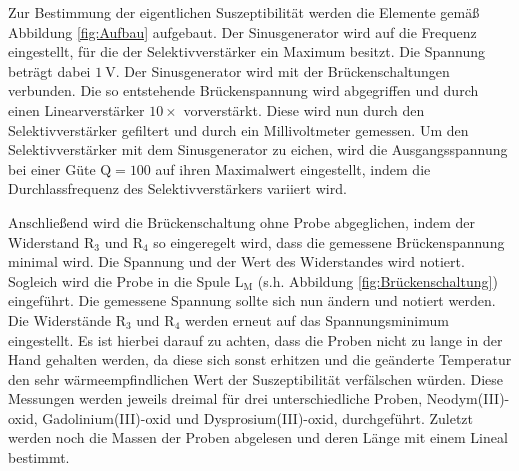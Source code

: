 Zur Bestimmung der eigentlichen Suszeptibilität werden die Elemente gemäß Abbildung \ref{fig:Aufbau} aufgebaut.
Der Sinusgenerator wird auf die Frequenz eingestellt, für die der Selektivverstärker ein Maximum besitzt.
Die Spannung beträgt dabei $\SI{1}{\volt}$.
Der Sinusgenerator wird mit der Brückenschaltungen verbunden.
Die so entstehende Brückenspannung wird abgegriffen und durch einen Linearverstärker $10\times$ vorverstärkt.
Diese wird nun durch den Selektivverstärker gefiltert und durch ein Millivoltmeter gemessen.
Um den Selektivverstärker mit dem Sinusgenerator zu eichen, wird die Ausgangsspannung bei einer Güte $\text{Q} = 100$ auf ihren Maximalwert eingestellt, indem die Durchlassfrequenz des Selektivverstärkers variiert wird.

Anschließend wird die Brückenschaltung ohne Probe abgeglichen, indem der Widerstand R$_3$ und R$_4$ so eingeregelt wird, dass die gemessene Brückenspannung minimal wird.
Die Spannung und der Wert des Widerstandes wird notiert.
Sogleich wird die Probe in die Spule L$_\text{M}$ (s.h. Abbildung \ref{fig:Brückenschaltung}) eingeführt.
Die gemessene Spannung sollte sich nun ändern und notiert werden.
Die Widerstände R$_3$ und R$_4$ werden erneut auf das Spannungsminimum eingestellt.
Es ist hierbei darauf zu achten, dass die Proben nicht zu lange in der Hand gehalten werden, da diese sich sonst erhitzen und die geänderte Temperatur den sehr wärmeempfindlichen Wert der Suszeptibilität verfälschen würden.
Diese Messungen werden jeweils dreimal für drei unterschiedliche Proben, Neodym(III)-oxid, Gadolinium(III)-oxid und Dysprosium(III)-oxid, durchgeführt.
Zuletzt werden noch die Massen der Proben abgelesen und deren Länge mit einem Lineal bestimmt.
